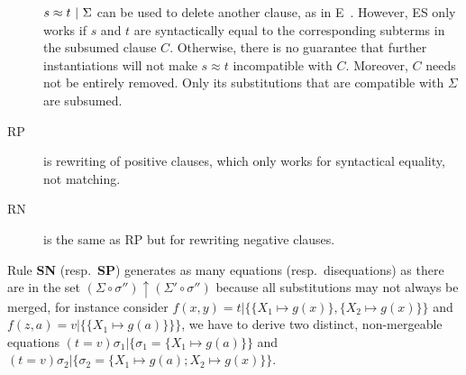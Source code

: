 \begin{description}
$ s\approx t ~|~ \Sigma $ can be used to delete another clause, as
in E~\cite{SS02}. However, ES only works if $s$ and $t$ are syntactically equal
to the corresponding subterms in the subsumed clause $C$. Otherwise, there is no
guarantee that further instantiations will not make $s\approx t$ incompatible
with $C$. Moreover, $C$ needs not be entirely removed. Only its substitutions
that are compatible with $\Sigma$ are subsumed.
\item[RP] is rewriting of positive clauses, which only works for syntactical
equality, not matching.
\item[RN] is the same as RP but for rewriting negative clauses.
\end{description}

Rule \textbf{SN} (resp.~\textbf{SP}) generates as many equations
(resp.~disequations) as there are in the set $(\Sigma \circ \sigma'')
\uparrow (\Sigma' \circ \sigma'')$ because all substitutions may not
always be merged, for instance consider $f(x, y) = t | \{
  \{ X_1 \mapsto g(x) \}, \{ X_2 \mapsto g(x) \}  \}$ and $f(z, a) = v | \{
  \{ X_1 \mapsto g(a) \} \} \}$, we have to derive two distinct, non-mergeable
equations
$ (t = v)\sigma_1 | \{ \sigma_1 = \{ X_1 \mapsto g(a) \} \}$ and
$ (t = v)\sigma_2 | \{ \sigma_2 = \{ X_1 \mapsto g(a); X_2 \mapsto g(x) \} \}$.

